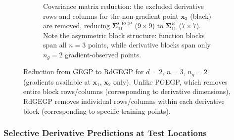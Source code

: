 \documentclass[12pt]{article}
\begin{document}
\begin{figure}[H]
\begin{subfigure}[b]{\textwidth}
		\caption{Covariance matrix reduction: the excluded derivative rows and columns for the non-gradient point $\mathbf{x}_3$ (black) are removed, reducing $\boldsymbol{\Sigma}_{11}^{\text{GEGP}}$ ($9 \times 9$) to $\boldsymbol{\Sigma}_{11}^{R}$ ($7 \times 7$). Note the asymmetric block structure: function blocks span all $n = 3$ points, while derivative blocks span only $n_g = 2$ gradient-observed points.}
		\label{fig:rdgegp_cov_reduction}
	\end{subfigure}

	\vspace{8pt}

	\caption{Reduction from GEGP to RdGEGP for $d = 2$, $n = 3$, $n_g = 2$ (gradients available at $\mathbf{x}_1$, $\mathbf{x}_2$ only). Unlike PGEGP, which removes entire block rows/columns (corresponding to derivative dimensions), RdGEGP removes individual rows/columns within each derivative block (corresponding to specific training points).}
	\label{fig:rdgegp_structure_2d}
\end{figure}

\subsubsection{Selective Derivative Predictions at Test Locations}
\label{subsubsec:rdgegp_selective_pred}
\end{document}
